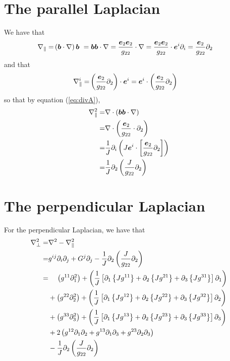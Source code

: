 \section{The parallel Laplacian}
%
We have that
%
\begin{align*}
    \nabla_\| =& \left(\boldsymbol{b} \cdot \nabla\right) \boldsymbol{b}\ = \boldsymbol{b} \boldsymbol{b} \cdot \nabla =
    \frac{\boldsymbol{e}_2 \boldsymbol{e}_2}{g_{22}} \cdot \nabla = \frac{\boldsymbol{e}_2
    \boldsymbol{e}_2}{g_{22}} \cdot \boldsymbol{e}^i \partial_i = \frac{\boldsymbol{e}_2}{g_{22}}
    \partial_2
\end{align*}
%
and that
%
\begin{align*}
    \nabla_\|^i =& \left(\frac{\boldsymbol{e}_2}{g_{22}} \partial_2\right)\cdot \boldsymbol{e}^i =
    \boldsymbol{e}^i \cdot \left(\frac{\boldsymbol{e}_2}{g_{22}} \partial_2\right)
\end{align*}
%
so that by equation (\ref{eq:divA}),
%
\begin{align*}
    \nabla_\|^2 =& \nabla\cdot\left(\boldsymbol{b} \boldsymbol{b} \cdot \nabla\right)\\ =&
    \nabla\cdot\left(\frac{\boldsymbol{e}_2}{g_{22}} \cdot \partial_2\right)\\ =& \frac{1}{J}
    \partial_i \left( J\boldsymbol{e}^i \cdot \left[\frac{\boldsymbol{e}_2}{g_{22}} \partial_2\right]
    \right)\\ =& \frac{1}{J} \partial_2 \left(\frac{J}{g_{22}} \partial_2\right)
\end{align*}


\section{The perpendicular Laplacian}
%
For the perpendicular Laplacian, we have that
%
\begin{align*}
    \grad_\perp^2 =& \grad^2 - \grad_\|^2\\ =& g^{ij} \partial_i \partial_j +
    G^j \partial_j -\frac{1}{J} \partial_2 \L(\frac{J}{g_{22}} \partial_2\R)\\
%
            =& \quad \, \L(g^{11} \partial_1^2\R) + \L( \frac{1}{J} \L[
\partial_1 \L\{J g^{11} \R\} + \partial_2 \L\{J g^{21} \R\} + \partial_3 \L\{J
g^{31} \R\} \R] \partial_1\R)\\ &+ \L(g^{22} \partial_2^2\R) + \L( \frac{1}{J}
    \L[ \partial_1 \L\{J g^{12} \R\} + \partial_2 \L\{J g^{22} \R\} +
    \partial_3 \L\{J g^{32} \R\} \R] \partial_2\R)\\ &+ \L(g^{33}
        \partial_3^2\R) + \L( \frac{1}{J} \L[ \partial_1 \L\{J g^{13} \R\} +
        \partial_2 \L\{J g^{23} \R\} + \partial_3 \L\{J g^{33} \R\} \R]
        \partial_3\R)\\ &+ 2\L( g^{12} \partial_1 \partial_2 + g^{13}
        \partial_1 \partial_3 + g^{23} \partial_2 \partial_3 \R)\\ &-
        \frac{1}{J} \partial_2 \L(\frac{J}{g_{22}} \partial_2\R)
\end{align*}
%


